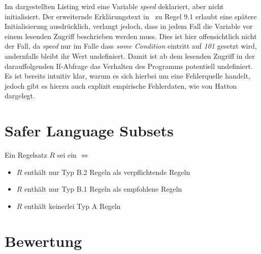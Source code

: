 \documentclass[a4paper,UKenglish,cleveref, autoref]{templates/lipics-v2019}
\begin{document}
    \noindent
    \begin{minipage}{\linewidth}
        \begin{example}
            
        \end{example}
    \end{minipage}

    Im dargestellten Listing wird eine Variable \textit{speed} deklariert, aber nicht initialisiert.
    Der erweiternde Erklärungstext in~\cite{MISRA2004} zu Regel 9.1 erlaubt eine spätere Initialisierung ausdrücklich, verlangt jedoch, dass
    in jedem Fall die Variable vor einem lesenden Zugriff beschrieben werden muss.
    Dies ist hier offensichtlich nicht der Fall, da \textit{speed} nur im Falle dass \textit{some Condition} eintritt auf
    \textit{101} gesetzt wird, andernfalls bleibt ihr Wert undefiniert.
    Damit ist ab dem lesenden Zugriff in der darauffolgenden If-Abfrage das Verhalten des Programms potentiell undefiniert.
    Es ist bereits intuitiv klar, warum es sich hierbei um eine Fehlerquelle handelt, jedoch gibt es hierzu auch explizit
    empirische Fehlerdaten, wie von Hatton dargelegt.\cite{hatton2004safer}

    \section{Safer Language Subsets}
    \label{sec:safer-language-subsets}


    \begin{definition}
        Ein Regelsatz $R$ sei ein \sls $\iff$
        \begin{itemize}
            \item $R$ enthält nur Typ B.2 Regeln als verpflichtende Regeln
            \item $R$ enthält nur Typ B.1 Regeln als empfohlene Regeln
            \item $R$ enthält keinerlei Typ A Regeln
        \end{itemize}
        
    \end{definition}
    
    \section{Bewertung}
    \label{sec:bewertung}

\end{document}
